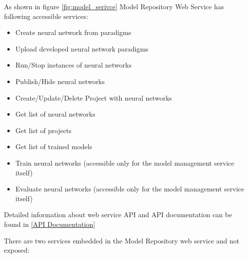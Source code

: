 As shown in figure \ref{fig:model_serivce} Model Repository Web Service has following accessible services:

\begin{itemize}
\item Create neural network from paradigms
\item Upload developed neural network paradigms
\item Run/Stop instances of neural networks
\item Publish/Hide neural networks 
\item Create/Update/Delete Project with neural networks
\item Get list of neural networks
\item Get list of projects
\item Get list of trained models 
\item Train neural networks (accessible only for the model management service itself)
\item Evaluate neural networks (accessible only for the model management service itself)
\end{itemize}

Detailed information about web service API and API documentation can be found in \autoref{API Documentation}


There are two services embedded in the Model Repository web service and not exposed:

